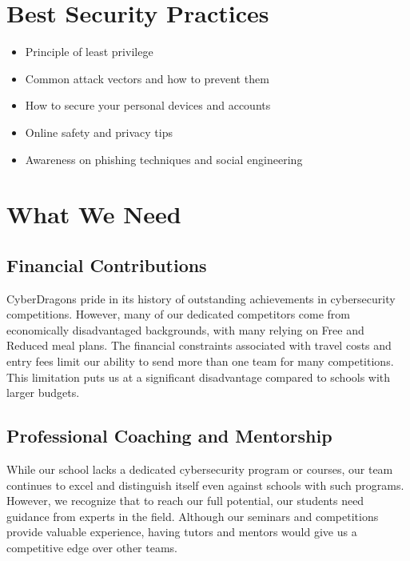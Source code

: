 \documentclass[
  letterpaper,
  DIV=11,
  numbers=noendperiod]{scrartcl}
\providecommand{\tightlist}{%
  \setlength{\itemsep}{0pt}\setlength{\parskip}{0pt}}\usepackage{longtable,booktabs,array}
\begin{document}
\hypertarget{best-security-practices}{%
\section{Best Security Practices}\label{best-security-practices}}

\begin{itemize}
\tightlist
\item
  Principle of least privilege
\item
  Common attack vectors and how to prevent them
\item
  How to secure your personal devices and accounts
\item
  Online safety and privacy tips
\item
  Awareness on phishing techniques and social engineering
\end{itemize}

\newpage{}

\hypertarget{what-we-need}{%
\section{What We Need}\label{what-we-need}}

\hypertarget{financial-contributions}{%
\subsection{Financial Contributions}\label{financial-contributions}}

CyberDragons pride in its history of outstanding achievements in
cybersecurity competitions. However, many of our dedicated competitors
come from economically disadvantaged backgrounds, with many relying on
Free and Reduced meal plans. The financial constraints associated with
travel costs and entry fees limit our ability to send more than one team
for many competitions. This limitation puts us at a significant
disadvantage compared to schools with larger budgets.

\hypertarget{professional-coaching-and-mentorship}{%
\subsection{Professional Coaching and
Mentorship}\label{professional-coaching-and-mentorship}}

While our school lacks a dedicated cybersecurity program or courses, our
team continues to excel and distinguish itself even against schools with
such programs. However, we recognize that to reach our full potential,
our students need guidance from experts in the field. Although our
seminars and competitions provide valuable experience, having tutors and
mentors would give us a competitive edge over other teams.
\end{document}
